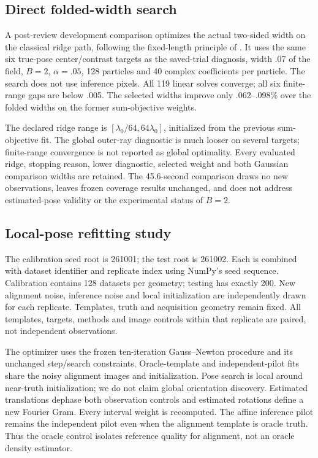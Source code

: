 \subsection{Direct folded-width search}\label{app:foldedridge}
A post-review development comparison optimizes the actual two-sided width on
the classical ridge path, following the fixed-length principle of
\citet{armstrong2018}. It uses the same six true-pose center/contrast targets
as the saved-trial diagnosis, width .07 of the field, $B=2$, $\alpha=.05$,
128 particles and 40 complex coefficients per particle. The search does not
use inference pixels. All 119 linear solves converge; all six finite-range
gaps are below .005. The selected widths improve only .062--.098\% over the
folded widths on the former sum-objective weights.

The declared ridge range is $[\lambda_0/64,64\lambda_0]$, initialized from
the previous sum-objective fit. The global outer-ray diagnostic is much
looser on several targets; finite-range convergence is not reported as
global optimality. Every evaluated ridge, stopping reason, lower diagnostic,
selected weight and both Gaussian comparison widths are retained. The
45.6-second comparison draws no new observations, leaves frozen coverage
results unchanged, and does not address estimated-pose validity or the
experimental status of $B=2$.

\subsection{Local-pose refitting study}
The calibration seed root is 261001; the test root is 261002. Each is
combined with dataset identifier and replicate index using NumPy's seed
sequence. Calibration contains 128 datasets per geometry; testing has
exactly 200. New alignment noise, inference noise and local initialization
are independently drawn for each replicate. Templates, truth and acquisition
geometry remain fixed. All templates, targets, methods and image controls
within that replicate are paired, not independent observations.

The optimizer uses the frozen ten-iteration Gauss--Newton procedure and its
unchanged step/search constraints. Oracle-template and independent-pilot
fits share the noisy alignment images and initialization. Pose search is
local around near-truth initialization; we do not claim global orientation
discovery. Estimated translations dephase both observation controls and
estimated rotations define a new Fourier Gram. Every interval weight is
recomputed. The affine inference pilot remains the independent pilot even
when the alignment template is oracle truth. Thus the oracle control
isolates reference quality for alignment, not an oracle density estimator.

